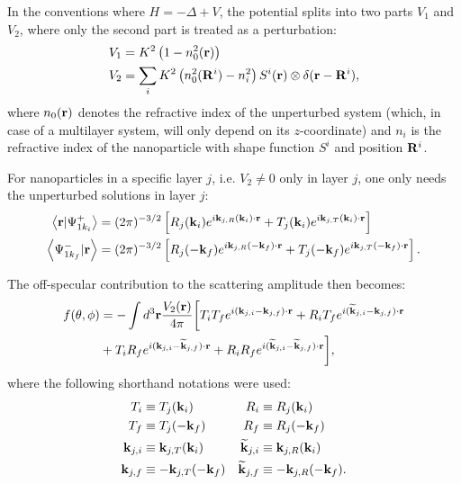 In the conventions where $H=-\Delta + V$, the potential splits into two parts $V_1$ and $V_2$, where only the second part is treated as a perturbation:
\begin{align*}
  V_1 & = K^2\left( 1-n_0^2(\mathbf{r})\right)  \\
  V_2 & = \sum_i K^2\left( n_0^2(\mathbf{R}^i) - n_i^2 \right) S^i(\mathbf{r}) \otimes \delta(\mathbf{r}-\mathbf{R}^i),
\end{align*}
where $n_0(\mathbf{r})$ denotes the refractive index of the unperturbed system (which, in case of a multilayer system, will only depend on its $z$-coordinate) and $n_i$ is the refractive index of the nanoparticle with shape function $S^i$ and position $\mathbf{R}^i$.

For nanoparticles in a specific layer $j$, i.e. $V_2\neq0$ only in layer $j$, one only needs the unperturbed solutions in layer $j$:
\begin{align*}
  \left\langle \mathbf{r} \vert \Psi^+_{1k_i} \right\rangle &= (2\pi)^{-3/2}\left[ R_j(\mathbf{k}_i) e^{i \mathbf{k}_{j,R}(\mathbf{k}_i)\cdot\mathbf{r}} + T_j(\mathbf{k}_i) e^{i \mathbf{k}_{j,T}(\mathbf{k}_i)\cdot\mathbf{r}} \right] \\
  \left\langle \Psi^-_{1k_f} \vert \mathbf{r} \right\rangle &= (2\pi)^{-3/2}\left[ R_j(-\mathbf{k}_f) e^{i \mathbf{k}_{j,R}(-\mathbf{k}_f)\cdot\mathbf{r}} + T_j(-\mathbf{k}_f) e^{i \mathbf{k}_{j,T}(-\mathbf{k}_f)\cdot\mathbf{r}} \right].
\end{align*}

The off-specular contribution to the scattering amplitude then becomes:
\begin{align*}
  f(\theta, \phi) &= -\int d^3\mathbf{r} \frac{V_2(\mathbf{r})}{4\pi} \biggl[ T_iT_fe^{i(\mathbf{k}_{j,i}-\mathbf{k}_{j,f})\cdot\mathbf{r}} + R_iT_fe^{i(\mathbf{\widetilde{k}}_{j,i}-\mathbf{k}_{j,f})\cdot\mathbf{r}} \\
   & + T_iR_fe^{i(\mathbf{k}_{j,i}-\mathbf{\widetilde{k}}_{j,f})\cdot\mathbf{r}} + R_iR_fe^{i(\mathbf{\widetilde{k}}_{j,i}-\mathbf{\widetilde{k}}_{j,f})\cdot\mathbf{r}} \biggr],
\end{align*}
where the following shorthand notations were used:
\begin{align*}
  T_i &\equiv  T_j(\mathbf{k}_i) & R_i &\equiv  R_j(\mathbf{k}_i)  \\
  T_f &\equiv  T_j(-\mathbf{k}_f) & R_f &\equiv  R_j(-\mathbf{k}_f) \\
  \mathbf{k}_{j,i} &\equiv \mathbf{k}_{j,T}(\mathbf{k}_i) & \mathbf{\widetilde{k}}_{j,i} &\equiv \mathbf{k}_{j,R}(\mathbf{k}_i)  \\
  \mathbf{k}_{j,f} &\equiv -\mathbf{k}_{j,T}(-\mathbf{k}_f) & \mathbf{\widetilde{k}}_{j,f} &\equiv -\mathbf{k}_{j,R}(-\mathbf{k}_f).
\end{align*}

